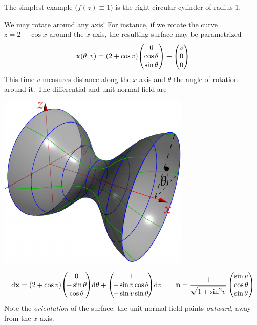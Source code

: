 \begin{examples}{}{}
	\exstart The simplest example ($f(z)\equiv 1$) is the right circular cylinder of radius 1.
	\begin{enumerate}\setcounter{enumi}{1}
	  \begin{minipage}[t]{0.56\linewidth}\vspace{0pt}
	  \item We may rotate around any axis! For instance, if we rotate the curve $z=2+\cos x$  around the $x$-axis, the resulting surface may be parametrized
	  \[
	  	{\mathbf{x}}(\theta,v)=(2+\cos v)\!\begin{pmatrix}0\\\cos\theta\\\sin\theta\end{pmatrix}+\begin{pmatrix}v\\0\\0\end{pmatrix}
		\]
		This time $v$ measures distance along the $x$-axis and $\theta$ the angle of rotation around it.
		\smallbreak
		The differential and unit normal field are
	  \end{minipage}
	  \hfill
	  \begin{minipage}[t]{0.39\linewidth}\vspace{-10pt}
			\flushright	\href{http://www.math.uci.edu/~ndonalds/math162a/surfaces-revol.html}{\includegraphics{surfaces-revol}}
	  \end{minipage}
	  \par%
	  \begin{gather*}
	  	\dvx=(2+\cos v)\!\threevec 0{\!-\sin\theta\!}{\cos\theta}\!\dth+\threevec{1}{\!-\sin v\cos\theta\!}{\!-\sin v\sin\theta\!}\!\dv \qquad
	  	\vn=\frac 1{\sqrt{1+\sin^2\!v}}\threevec{\sin v}{\cos\theta}{\sin\theta}
	  \end{gather*}
	  Note the \emph{orientation} of the surface: the unit normal field points \emph{outward,} away from the $x$-axis.
	\end{enumerate}
\end{examples}


